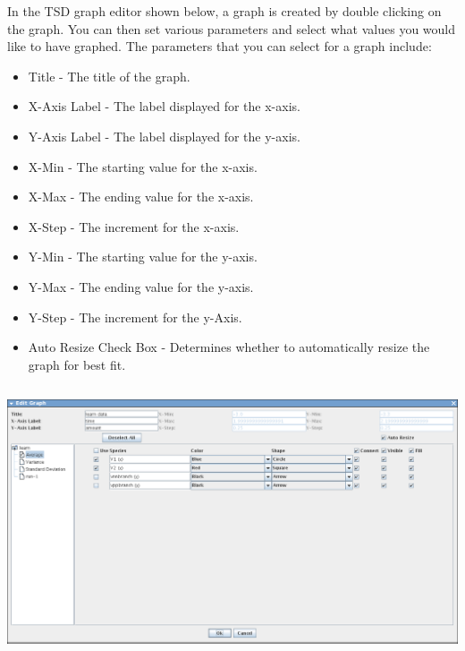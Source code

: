 \documentclass[titlepage,11pt]{article}
\begin{document}
In the TSD graph editor shown below,
a graph is created by double clicking on the graph. You can then set
various parameters and select what values you would like to have
graphed. The parameters that you can select for a graph include: 
\begin{itemize}
\item Title - The title of the graph.
\item X-Axis Label - The label displayed for the x-axis. 
\item Y-Axis Label - The label displayed for the y-axis. 
\item X-Min - The starting value for the x-axis. 
\item X-Max - The ending value for the x-axis. 
\item X-Step - The increment for the x-axis. 
\item Y-Min - The starting value for the y-axis. 
\item Y-Max - The ending value for the y-axis. 
\item Y-Step - The increment for the y-Axis. 
\item Auto Resize Check Box -
Determines whether to automatically resize the graph for best fit. 
\end{itemize}
\begin{center}
\includegraphics[height=80mm]{screenshots/editGraphLema}
\end{center}
\end{document}
